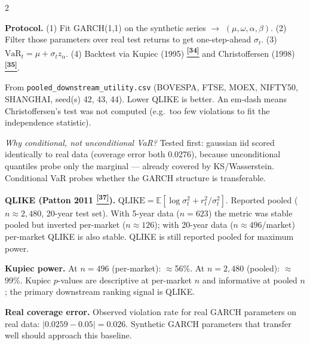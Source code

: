 \documentclass[10pt]{article}
\newcommand{\tcite}[1]{%
  \hyperlink{R:#1}{\textsuperscript{\scriptsize\textbf{[#1]}}}}
\newcommand{\E}{\mathbb{E}}
\begin{document}
\begin{multicols}{2}
{\textbf{Protocol.} (1) Fit GARCH(1,1) on the synthetic series $\to$ $(\mu, \omega, \alpha, \beta)$. (2) Filter those parameters over real test returns to get one-step-ahead $\sigma_t$. (3) $\text{VaR}_t = \mu + \sigma_t z_\alpha$. (4) Backtest via Kupiec (1995)\tcite{34} and Christoffersen (1998)\tcite{35}.

\smallskip
{}

\smallskip
{\small From \texttt{pooled\_downstream\_utility.csv} (BOVESPA, FTSE, MOEX, NIFTY50, SHANGHAI, seed(s) 42, 43, 44). Lower QLIKE is better. An em-dash means Christoffersen's test was not computed (e.g.\ too few violations to fit the independence statistic).}

\textit{Why conditional, not unconditional VaR?} Tested first: gaussian iid scored identically to real data (coverage error both 0.0276), because unconditional quantiles probe only the marginal --- already covered by KS/Wasserstein. Conditional VaR probes whether the GARCH structure is transferable.

\textbf{QLIKE (Patton 2011\tcite{37}).} $\text{QLIKE} = \E[\log\sigma_t^2 + r_t^2/\sigma_t^2]$. Reported pooled ($n\approx2{,}480$, 20-year test set). With 5-year data ($n=623$) the metric was stable pooled but inverted per-market ($n\approx126$); with 20-year data ($n\approx496$/market) per-market QLIKE is also stable. QLIKE is still reported pooled for maximum power.

\textbf{Kupiec power.} At $n=496$ (per-market): $\approx$56\%. At $n=2{,}480$ (pooled): $\approx$99\%. Kupiec $p$-values are descriptive at per-market $n$ and informative at pooled $n$; the primary downstream ranking signal is QLIKE.

\textbf{Real coverage error.} Observed violation rate for real GARCH parameters on real data: $|0.0259 - 0.05| = 0.026$. Synthetic GARCH parameters that transfer well should approach this baseline.}


\end{multicols}
\end{document}
